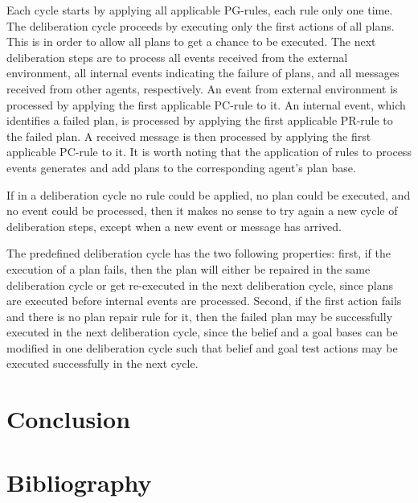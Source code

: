 \documentclass[a4paper]{article}
\begin{document}
Each cycle starts by applying all applicable PG-rules, each rule only one time. The deliberation cycle proceeds by executing only the first actions of all plans. This is in order to allow all plans to get a chance to be executed. The next deliberation steps are to
process all events received from the external environment, all internal events indicating the failure of plans, and all messages received from other agents, respectively. An event from external environment is processed by applying the first applicable PC-rule to it. An internal event, which identifies a failed plan, is processed by applying the first applicable PR-rule to the failed plan. A received message is then processed by applying the first applicable PC-rule to it. It is worth noting that the application of rules
to process events generates and add plans to the corresponding agent’s plan base.

If in a deliberation cycle no rule could be applied, no plan could be executed, and no event could be processed, then it makes no sense to try again a new cycle of deliberation steps, except when a new event or message has arrived.

The predefined deliberation cycle has the two following properties: first, if the execution of a plan fails, then the plan will either be repaired in the same deliberation cycle or get re-executed in the next deliberation cycle, since plans are executed before internal events are processed. Second, if the first action fails and there is no plan repair rule for it, then the failed plan may be successfully executed in the next deliberation cycle, since the belief and a goal bases can be modified in one deliberation cycle such that belief and goal test actions may be executed successfully in the next cycle.


\section{Conclusion} %


\section{Bibliography}
\nocite{*}


\end{document}
